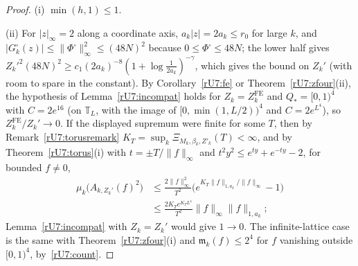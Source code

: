 \begin{proof}
(i) $\min(h,1)\le1$.

(ii) For $|z|_\infty=2$ along a coordinate axis, $a_k|z|=2a_k\le r_0$ for large
$k$, and $|G^\square_k(z)|\le\|\Phi^\square\|_\infty^2\le(48N)^2$ because $0\le
\Phi^\square\le48N$; the lower half gives $Z_k'^2(48N)^2\ge c_1(2a_k)^{-8}(1+
\log\frac1{2a_k})^{-\gamma}$, which gives the bound on $Z_k'$ (with room to
spare in the constant). By Corollary~\ref{rU7:fe} or
Theorem~\ref{rU7:zfour}(ii), the hypothesis of Lemma~\ref{rU7:incompat} holds
for $Z_k=Z^{\mathrm{FE}}_k$ and $Q_*=[0,1)^4$ with $C=2e^{16}$ (on $\mathbb T_L$, with
the image of $[0,\min(1,L/2))^4$ and $C=2e^{L^4}$),
so $Z^{\mathrm{FE}}_k/Z_k'\to0$. If the displayed supremum were finite for some
$T$, then by Remark~\ref{rU7:torusremark} $K_T=\sup_k\Xi_{M_k,\beta_k,Z'_k}(T)
<\infty$, and by Theorem~\ref{rU7:torus}(i) with $t=\pm T/\|f\|_\infty$ and
$t^2y^2\le e^{ty}+e^{-ty}-2$, for bounded $f\ne0$,
\begin{align*}
\mu_k\bigl(A_{k,Z_k'}(f)^2\bigr)&\le\frac{2\|f\|_\infty^2}{T^2}\bigl(e^{K_T\|f\|
_{1,a_k}/\|f\|_\infty}-1\bigr)\\
&\le\frac{2K_Te^{K_TL^4}}{T^2}\|f\|_\infty\|f\|_{1,a_k};
\end{align*}
Lemma~\ref{rU7:incompat} with $Z_k=Z_k'$ would give $1\to0$. The
infinite-lattice case is the same with Theorem~\ref{rU7:zfour}(i) and
$\mathfrak m_k(f)\le2^4$ for $f$ vanishing outside $[0,1)^4$, by~\eqref{rU7:count}.


\end{proof}
